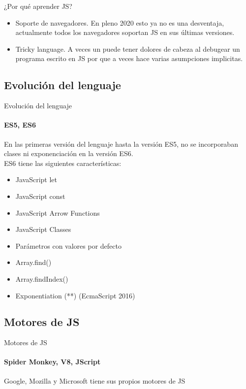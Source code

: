 \documentclass[aspectratio=169]{beamer}
\begin{document}
\begin{darkframes}
\begin{frame}{¿Por qué aprender JS?}
\begin{itemize}
        \item Soporte de navegadores. En pleno 2020 esto ya no es una desventaja, actualmente todos los navegadores soportan JS en sus últimas versiones.

        \item Tricky language. A veces un puede tener dolores de cabeza al debugear un programa escrito en JS por que a veces hace varias asumpciones implicitas.
      \end{itemize}

    \end{frame}

    \subsection{Evolución del lenguaje}
    \begin{frame}{Evolución del lenguaje}
      \framesubtitle{ES5, ES6}
      En las primeras versión del lenguaje hasta la versión ES5, no se incorporaban clases ni exponenciación en la versión ES6.\\

      ES6 tiene las siguientes características:

      \begin{multicols}{2}
        \begin{itemize}
          \item JavaScript let
          \item JavaScript const
          \item JavaScript Arrow Functions
          \item JavaScript Classes
          \item Parámetros con valores por defecto
          \item Array.find()
          \item Array.findIndex()
          \item Exponentiation (**) (EcmaScript 2016)
        \end{itemize}
      \end{multicols}
    \end{frame}

    \subsection{Motores de JS}
    \begin{frame}{Motores de JS}
      \framesubtitle{Spider Monkey, V8, JScript}
      Google, Mozilla y Microsoft tiene sus propios motores de JS


\end{frame}
\end{darkframes}
\end{document}
